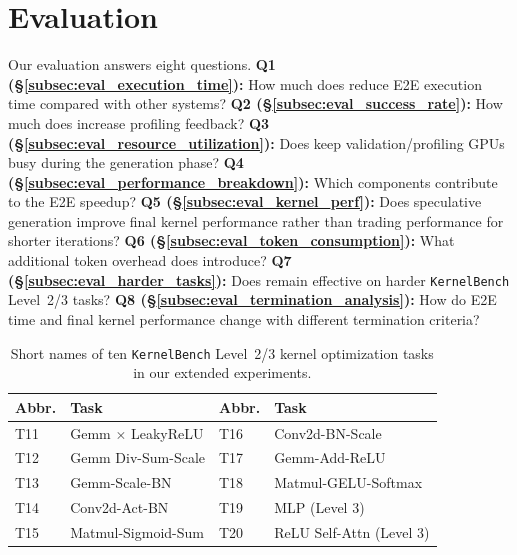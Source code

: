\section{Evaluation}\label{sec:eval}

Our evaluation answers eight questions.
\textbf{Q1 (\S\ref{subsec:eval_execution_time}):} How much does \sysname{} reduce E2E execution time compared with other systems?
\textbf{Q2 (\S\ref{subsec:eval_success_rate}):} How much does \sysname{} increase profiling feedback?
\textbf{Q3 (\S\ref{subsec:eval_resource_utilization}):} Does \sysname{} keep validation/profiling GPUs busy during the generation phase?
\textbf{Q4 (\S\ref{subsec:eval_performance_breakdown}):} Which components contribute to the E2E speedup?
\textbf{Q5 (\S\ref{subsec:eval_kernel_perf}):} Does speculative generation improve final kernel performance rather than trading performance for shorter iterations?
\textbf{Q6 (\S\ref{subsec:eval_token_consumption}):} What additional token overhead does \sysname{} introduce?
\textbf{Q7 (\S\ref{subsec:eval_harder_tasks}):} Does \sysname{} remain effective on harder \texttt{KernelBench} Level~2/3 tasks?
\textbf{Q8 (\S\ref{subsec:eval_termination_analysis}):} How do E2E time and final kernel performance change with different termination criteria?

\begin{table}[t]
    \centering
    \caption{Short names of ten \texttt{KernelBench} Level~2/3 kernel
    optimization tasks in our extended experiments.}
    \vspace{-10pt}
    \label{tab:tasks_level_2_and_3}
    \small
    \setlength{\tabcolsep}{3pt}
    \renewcommand{\arraystretch}{0.9}
    \begin{tabular}{@{}llll@{}}
    \toprule
    \textbf{Abbr.} & \textbf{Task} & \textbf{Abbr.} & \textbf{Task} \\
    \midrule
    T11 & Gemm $\times$ LeakyReLU   & T16 & Conv2d-BN-Scale \\
    T12 & Gemm Div-Sum-Scale         & T17 & Gemm-Add-ReLU \\
    T13 & Gemm-Scale-BN              & T18 & Matmul-GELU-Softmax \\
    T14 & Conv2d-Act-BN              & T19 & MLP (Level 3) \\
    T15 & Matmul-Sigmoid-Sum         & T20 & ReLU Self-Attn (Level 3) \\
    \bottomrule
    \end{tabular}
    \vspace{-15pt}
\end{table}
